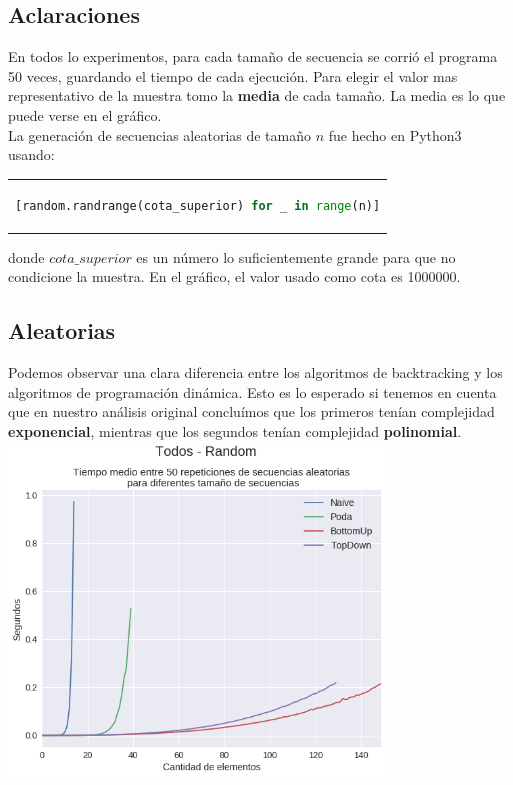 \subsection{Aclaraciones}
En todos lo experimentos, para cada tamaño de secuencia se corrió el programa 50 veces, guardando el tiempo de cada ejecución. Para elegir el valor mas representativo de la muestra tomo la \textbf{media} de cada tamaño. La media es lo que puede verse en el gráfico. \\

La generación de secuencias aleatorias de tamaño $n$ fue hecho en Python3 usando: 
\begin{center}
\begin{tabular}{c}
\begin{lstlisting}[language=Python]
[random.randrange(cota_superior) for _ in range(n)]
\end{lstlisting}
\end{tabular}
\end{center}

donde $cota\_superior$ es un número lo suficientemente grande para que no condicione la muestra. En el gráfico, el valor usado como cota es 1000000.

\subsection{Aleatorias}

Podemos observar una clara diferencia entre los algoritmos de backtracking y los algoritmos de programación dinámica. Esto es lo esperado si tenemos en cuenta que en nuestro análisis original concluímos que los primeros tenían complejidad \textbf{exponencial}, mientras que los segundos tenían complejidad \textbf{polinomial}. \\

{\centering
  \includegraphics[width=0.75\textwidth]{informe/img/experimentos/todos-random.png} \\
} 

